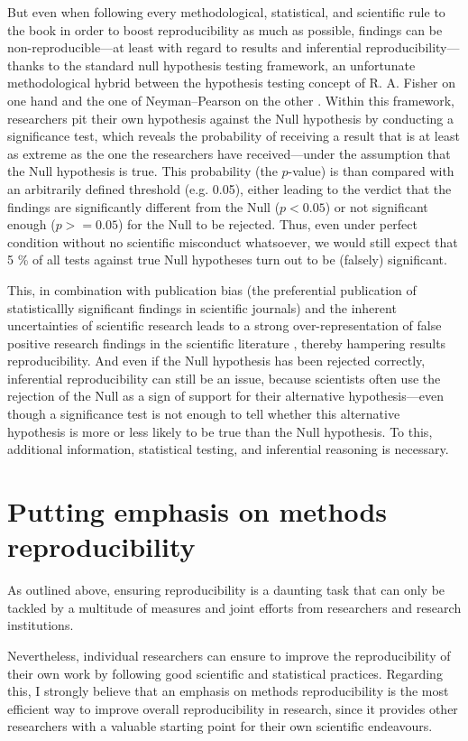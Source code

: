 \documentclass[11pt, a4paper,twoside]{report}\usepackage[]{graphicx}\usepackage[]{color}
\begin{document}
But even when following every methodological, statistical, and scientific rule to the book in order to boost reproducibility as much as possible, findings can be non-reproducible---at least with regard to results and inferential reproducibility---thanks to the standard null hypothesis testing framework, an unfortunate methodological hybrid between the hypothesis testing concept of R. A. Fisher on one hand and the one of Neyman--Pearson on the other \citep{amrhein_earth_2017}. Within this framework, researchers pit their own hypothesis against the Null hypothesis by conducting a significance test, which reveals the probability of receiving a result that is at least as extreme as the one the researchers have received---under the assumption that the Null hypothesis is true. This probability (the $p$-value) is than compared with an arbitrarily defined threshold (e.g. 0.05), either leading to the verdict that the findings are significantly different from the Null ($p < 0.05$) or not significant enough ($p >= 0.05$) for the Null to be rejected. Thus, even under perfect condition without no scientific misconduct whatsoever, we would still expect that 5 \% of all tests against true Null hypotheses turn out to be (falsely) significant. 

This, in combination with publication bias (the preferential publication of statisticallly significant findings in scientific journals) and the inherent uncertainties of scientific research leads to a strong over-representation of false positive research findings in the scientific literature \citep{ioannidis_why_2005}, thereby hampering results reproducibility. And even if the Null hypothesis has been rejected correctly, inferential reproducibility can still be an issue, because scientists often use the rejection of the Null as a sign of support for their alternative hypothesis---even though a significance test is not enough to tell whether this alternative hypothesis is more or less likely to be true than the Null hypothesis. To this, additional information, statistical testing, and inferential reasoning is necessary.

\section{Putting emphasis on methods reproducibility}
As outlined above, ensuring reproducibility is a daunting task that can only be tackled by a multitude of measures and joint efforts from researchers and research institutions. 

Nevertheless, individual researchers can ensure to improve the reproducibility of their own work by following good scientific and statistical practices. Regarding this, I strongly believe that an emphasis on methods reproducibility is the most efficient way to improve overall reproducibility in research, since it provides other researchers with a valuable starting point for their own scientific endeavours.
\end{document}
